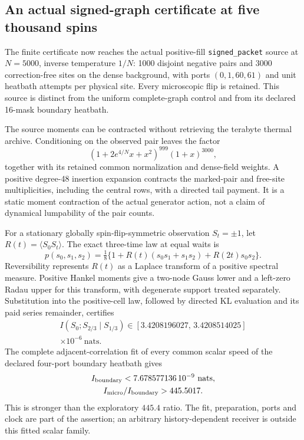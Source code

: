 \subsection{An actual signed-graph certificate at five thousand spins}
\label{sec:signed-memory-12}

The finite certificate now reaches the actual positive-fill
\texttt{signed\_packet} source at $N=5000$, inverse temperature $1/N$:
1000 disjoint negative pairs and 3000 correction-free sites on the dense
background, with ports $(0,1,60,61)$ and unit heatbath attempts per physical
site. Every microscopic flip is retained. This source is distinct from
the uniform complete-graph control and from its declared 16-mask boundary
heatbath.

The source moments can be contracted without retrieving the terabyte
thermal archive. Conditioning on the observed pair leaves the factor
\begin{equation}
 (1+2e^{4/N}x+x^2)^{999}(1+x)^{3000},
\end{equation}
together with its retained common normalization and dense-field weights.
A positive degree-48 insertion expansion contracts the marked-pair and
free-site multiplicities, including the central rows, with a directed
tail payment. It is a static moment contraction of the actual generator
action, not a claim of dynamical lumpability of the pair counts.

For a stationary globally spin-flip-symmetric observation $S_t=\pm1$,
let $R(t)=\langle S_0S_t\rangle$. The exact three-time law at equal waits is
\begin{equation}
 p(s_0,s_1,s_2)=\tfrac18\{1+R(t)(s_0s_1+s_1s_2)
                              +R(2t)s_0s_2\}.
\label{eq:binary-three-law-12}
\end{equation}
Reversibility represents $R(t)$ as a Laplace transform of a positive
spectral measure. Positive Hankel moments give a two-node Gauss lower
and a left-zero Radau upper for this transform, with degenerate support
treated separately. Substitution into the positive-cell law, followed by
directed KL evaluation and its paid series remainder, certifies
\begin{equation}
 \begin{gathered}
 I(S_0;S_{2/3}\mid S_{1/3})\in
 [3.4208196027,\,3.4208514025]\\
 \times10^{-6}\ \mathrm{nats}.
 \end{gathered}
\label{eq:signed-cmi-12}
\end{equation}
The complete adjacent-correlation fit of every common scalar speed of
the declared four-port boundary heatbath gives
\begin{equation}
\begin{gathered}
 I_{\rm boundary}<7.678577136\,10^{-9}\ \mathrm{nats},\\
 I_{\rm micro}/I_{\rm boundary}>445.5017.
\end{gathered}
\end{equation}
This is stronger than the exploratory $445.4$ ratio. The fit, preparation,
ports and clock are part of the assertion; an arbitrary history-dependent
receiver is outside this fitted scalar family.

